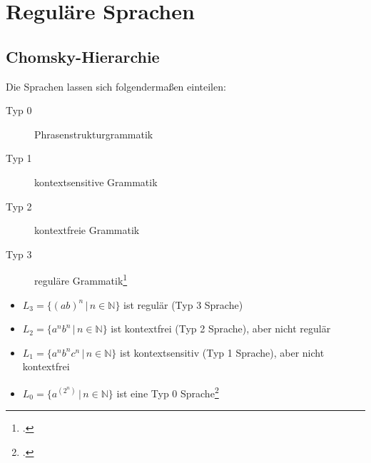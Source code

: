\documentclass{lehramt-informatik-haupt}
\begin{document}

\chapter{Reguläre Sprachen}

\section{Chomsky-Hierarchie}

Die Sprachen lassen sich folgendermaßen einteilen:

\begin{description}
\item[Typ 0] Phrasenstrukturgrammatik
\item[Typ 1] kontextsensitive Grammatik
\item[Typ 2] kontextfreie Grammatik
\item[Typ 3] reguläre Grammatik\footcite[Seite 14]{theoinf:fs:1}
\end{description}

\begin{itemize}
\item $L_3 = \{(ab)^n \, | \, n \in \mathbb{N}\}$ ist regulär (Typ 3 Sprache)

\item $L_2 = \{a^n b^n \, | \, n \in \mathbb{N}\}$ ist kontextfrei (Typ 2 Sprache), aber nicht regulär

\item $L_1 = \{a^n b^n c^n \, | \, n \in \mathbb{N}\}$ ist kontextsensitiv (Typ 1 Sprache), aber nicht kontextfrei

\item $L_0 = \{a^{(2^n)}\, | \, n \in \mathbb{N}\}$ ist eine Typ 0 Sprache\footcite[Seite 15]{theoinf:fs:1}

\end{itemize}

\literatur
\end{document}
